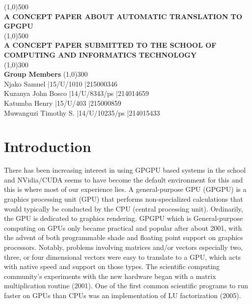 \documentclass{report}
\begin{document}
\begin{titlepage}
    \begin{center}
\line(1,0){500}\\
\huge{\bfseries A CONCEPT PAPER ABOUT   AUTOMATIC TRANSLATION TO GPGPU\\}
\line(1,0){500}\\
[0.25in]
\huge{\bfseries A CONCEPT PAPER SUBMITTED TO THE SCHOOL OF COMPUTING AND INFORMATICS TECHNOLOGY}\\ 
[1.5in] 
\line(1,0){300}\\ 
\huge{\bfseries Group Members}
\line(1,0){300}\\ 
Njako Samuel	|15/U/1010	|215000346\\
Kuzanya John Bosco	|14/U/8343/ps	|214014659\\
Katumba Henry	|15/U/403	|215000859\\
Muwanguzi Timothy S. |14/U/10235/ps	|214015433\\

    \end{center}
\end{titlepage} 
       

\section{Introduction}   
There has been increasing interest in using GPGPU based systems in the school and NVidia/CUDA seems to have become the default environment for this and this is where most of our experience lies. A general-purpose GPU (GPGPU) is a graphics processing unit (GPU) that performs non-specialized calculations that would typically be conducted by the CPU (central processing unit). Ordinarily, the GPU is dedicated to graphics rendering. GPGPU which is General-purpose computing on GPUs only became practical and popular after about 2001, with the advent of both programmable shade and floating point support on graphics processors. Notably, problems involving matrices and/or vectors especially two, three, or four dimensional vectors were easy to translate to a GPU, which acts with native speed and support on those types. The scientific computing community's experiments with the new hardware began with a matrix multiplication routine (2001). One of the first common scientific programs to run faster on GPUs than CPUs was an implementation of LU factorization (2005).
   
\end{document}
